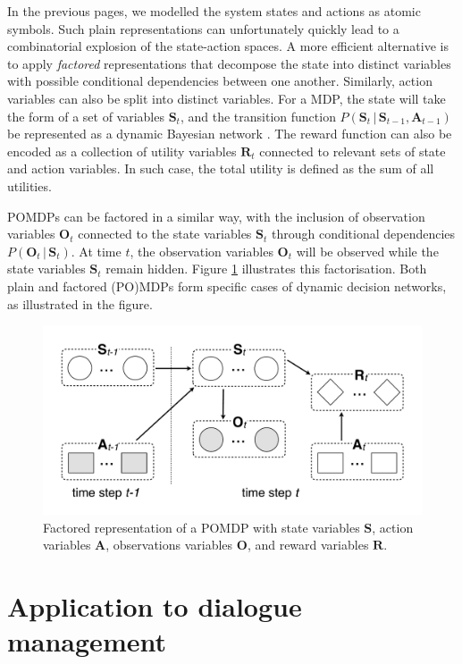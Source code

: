 In the previous pages, we modelled the system states and actions as atomic symbols.  Such plain representations can unfortunately quickly lead to a combinatorial explosion of the state-action spaces. A more efficient alternative is to apply \textit{factored} representations that decompose the state into distinct variables with possible conditional dependencies between one another.  Similarly, action variables can also be split into distinct variables.  For a MDP, the state will take the form of a set of variables $\mathbf{S}_t$, and the transition function $P(\mathbf{S}_t \, | \, \mathbf{S}_{t-1},\mathbf{A}_{t-1})$ be represented as a dynamic Bayesian network \citep{boutilier1999}. The reward function can also be encoded as a collection of utility variables $\mathbf{R}_t$ connected to relevant sets of state and action variables. In such case, the total utility is defined as the sum of all utilities.

POMDPs can be factored in a similar way, with the inclusion of observation variables $\mathbf{O}_t$ connected to the state variables $\mathbf{S}_t$ through conditional dependencies $P(\mathbf{O}_t \, | \, \mathbf{S}_t)$.  At time $t$, the observation variables $\mathbf{O}_t$ will be observed while the state variables  $\mathbf{S}_t$ remain hidden. Figure \ref{fig:pomdp3} illustrates this factorisation. Both plain and factored (PO)MDPs form specific cases of dynamic decision networks, as illustrated in the figure.

\begin{figure}[h]
\centering
\includegraphics[scale=0.25]{imgs/pomdp3.pdf}
\caption{Factored representation of a POMDP with state variables $\mathbf{S}$, action variables $\mathbf{A}$, observations variables $\mathbf{O}$, and reward variables $\mathbf{R}$. }
\label{fig:pomdp3}
\end{figure}

\section{Application to dialogue management}
\label{sec:application-dm}

